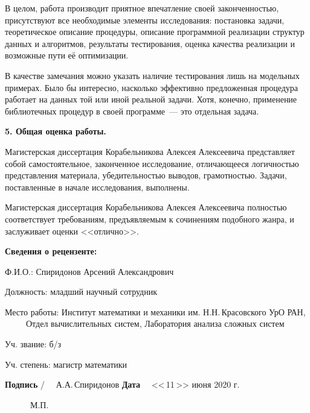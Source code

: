 \documentclass[12pt]{article}
\begin{document}
В целом, работа производит приятное впечатление своей законченностью, присутствуют все необходимые элементы исследования: постановка задачи, теоретическое описание процедуры, описание программной реализации структур данных и алгоритмов, результаты тестирования, оценка качества реализации и возможные пути её оптимизации.

В качестве замечания можно указать наличие тестирования лишь на модельных примерах. Было бы интересно, насколько эффективно предложенная процедура работает на данных той или иной реальной задачи. Хотя, конечно, применение библиотечных процедур в своей программе~--- это отдельная задача.

\smallskip

\noindent
\textbf{5. Общая оценка работы.}

\smallskip

Магистерская диссертация Корабельникова Алексея Алексеевича представляет собой самостоятельное, законченное исследование, отличающееся логичностью представления материала, убедительностью выводов, грамотностью. Задачи, поставленные в начале исследования, выполнены.

Магистерская диссертация Корабельникова Алексея Алексеевича полностью соответствует требованиям, предъявляемым к сочинениям подобного жанра, и заслуживает оценки <<отлично>>.

\bigskip

{
\raggedright 

\noindent
\textbf{Сведения о рецензенте:}

Ф.И.О.: Спиридонов Арсений Александрович

Должность: младший научный сотрудник

Место работы: Институт математики и механики им. Н.Н.\,Красовского УрО РАН,\\
~~~~~Отдел вычислительных систем, Лаборатория анализа сложных систем

Уч. звание: б/з \hspace*{20mm} 

Уч. степень: магистр математики

}

\bigskip
\bigskip
\bigskip

\noindent
\textbf{Подпись} %
% 
\hspace*{5mm}%
%
\hspace*{8mm}%
{\large /}%
% 
~~А.А.\,Спиридонов%
\hspace*{3cm}%
\textbf{Дата} 
% 
~~<<\,11\,>> июня 2020 г.

\bigskip

~~~~~~М.П.



 
\end{document}
